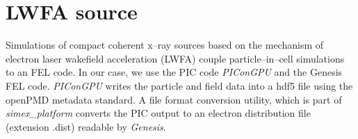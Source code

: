\documentclass[12pt]{scrartcl}
\begin{document}
\section{LWFA source}\label{sec:lwfa_source}
Simulations of compact coherent x--ray sources based on the mechanism of
electron laser wakefield acceleration (LWFA) couple particle--in--cell
simulations to an FEL code. In our case, we use the PIC code \textit{PIConGPU}
and the Genesis FEL code. \textit{PIConGPU} writes the particle and field data
into a hdf5 file using the openPMD \cite{Huebl2015} metadata standard. A file format conversion utility, which is part of
\textit{simex\_platform} converts the PIC output to an electron distribution
file (extension .dist) readable by \textit{Genesis}.

\printbibliography[notkeyword=report, notkeyword=zenodo, title={Journal articles}]
%
\printbibliography[keyword=eucall, keyword=report, title={EUCALL Reports}]
%
\printbibliography[keyword=zenodo, title={EUCALL Data Repository Depositions}]
\end{document}
